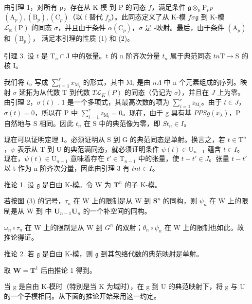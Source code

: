 由引理 1，对所有 p，存在从 K-模  到 P 的同态 \(f\)，满足条件 \(\mathfrak{g} \otimes_{\mathbb{K}} \mathrm{P}_p\)\(p\)\((\mathrm{A}_p), (\mathrm{B}_p), (\mathrm{C}_p)\)（以 f 替代 \(f_p\)）。此同态定义了从 K-模 \(f\)\(\sigma\)\(\mathfrak{g}\) 到 K-模 \(\mathcal{L}_{\mathbb{K}}(\mathrm{P})\) 的同态 \(\sigma\)，并且由于条件 \(\alpha\)\((\mathrm{C}_p)\)，\(\sigma\) 是 -映射。最后，由于条件 \((\mathrm{A}_p)\) 和 \((\mathrm{B}_p)\)， 满足本引理的性质 (1) 和 (2)。

引理 3. 设 \(t\) 是 \(\mathrm{T}_n \cap \mathrm{J}\) 中的张量。t 的 n 阶齐次分量 \(t_n\) 属于典范同态 \(t\)\(n\)\(\mathrm{T} \to \mathrm{S}\) 的核 I。

我们将 \(t_n\) 写成 \(\sum_{i=1}^{r} x_{\mathrm{M}_i}\) 的形式，其中 \(\mathrm{M}_i\) 是由 \(n\)\(\Lambda\) 中 n 个元素组成的序列。映射 \(\sigma\) 延拓为从代数 T 到代数 \(T\)\(\mathcal{L}_K(P)\) 的同态（仍记为 \(\sigma\)），并且在 \(J\) 上为零。由引理 2，\(\sigma(t)\) . 1 是一个多项式，其最高次数的项为 \(\sum_{i=1}^{r} z_{\mathrm{M}_i}\)。由于 \(t \in J\)，\(\sigma(t) = 0\)，所以在 P 中 \(\sum_{i=1}^{r} z_{\mathrm{M}_i} = 0\)。现在，由于 g 具有基 \(P\)\(P\)\(S\)\(g\)\((x_\lambda)\)，P 自然地与 S 相同。因此 \(t_n\) 在 S 中的典范像为零，即 \(S\)\(t_n \in I\)。

现在可以证明定理 1。必须证明从 S 到 G 的典范同态是单射。换言之，若 \(t \in \mathrm{T}^n\)，\(\psi\) 表示从 T 到 U 的典范满同态，就必须证明条件 \(\psi(t) \in \mathrm{U}_{n-1}\) 蕴含 \(t \in I\)。现在，\(\psi(t) \in \mathrm{U}_{n-1}\) 意味着存在 \(t' \in \mathrm{T}_{n-1}\) 中的张量，使 \(t - t' \in J\)。张量 \(t - t'\) 以 t 作为 n 阶齐次分量，因此由引理 3 有 \(t\)\(n\)\(t \in I\)。

推论 1. 设 \(\mathfrak{g}\) 是自由 K-模。令 W 为 \(\mathbf{T}^n\) 的子 K-模。

若按图 (3) 的记号，\(\tau_{n}\) 在 W 上的限制是从 W 到 \(\mathbf{S}^n\) 的同构，则 \(\psi_{n}\) 在 W 上的限制是从 W 到  中 \(\mathbf{U}_{n-1}\)\(\mathbf{U}_n\) 的一个补空间的同构。

\(\omega_{n} \circ \tau_{n}\) 在 W 上的限制是从 W 到 \(G^{n}\) 的双射；\(\theta_{n} \circ \psi_{n}\) 在 W 上的限制也如此。故推论得证。

推论 2. 若 \(\mathfrak{g}\) 是自由 K-模，则 \(\mathfrak{g}\) 到其包络代数的典范映射是单射。

取 \(\mathbf{W} = \mathbf{T}^1\) 后由推论 1 得到。

当 g 是自由 K-模时（特别是当 K 为域时），在 g 到 U 的典范映射下，将 g 与 U 的一个子模相同。从下面的推论开始采用这一约定。

